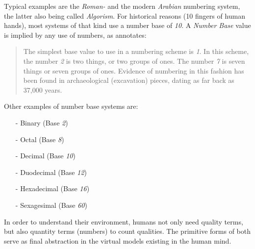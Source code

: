 Typical examples are the \emph{Roman-} and the modern \emph{Arabian} numbering
system, the latter also being called \emph{Algorism}. For historical reasons
(10 fingers of human hands), most systems of that kind use a number base of
\emph{10}. A \emph{Number Base} value is implied by any use of numbers, as
\cite{poseidon} annotates:

\begin{quote}
    The simplest base value to use in a numbering scheme is \emph{1}. In this
    scheme, the number \emph{2} is two things, or two groups of ones. The number
    \emph{7} is seven things or seven groups of ones. Evidence of numbering
    in this fashion has been found in archaeological (excavation) pieces,
    dating as far back as 37,000 years.
\end{quote}

Other examples of number base systems are:

\begin{itemize}
    \item[-] Binary (Base \emph{2})
    \item[-] Octal (Base \emph{8})
    \item[-] Decimal (Base \emph{10})
    \item[-] Duodecimal (Base \emph{12})
    \item[-] Hexadecimal (Base \emph{16})
    \item[-] Sexagesimal (Base \emph{60})
\end{itemize}

In order to understand their environment, humans not only need quality terms,
but also quantity terms (numbers) to count qualities. The primitive forms of
both serve as final abstraction in the virtual models existing in the human
mind.
